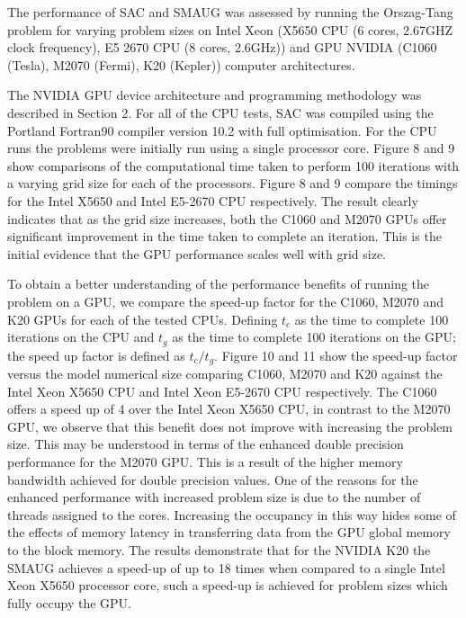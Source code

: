 The performance of SAC and SMAUG was assessed by running the Orszag-Tang problem for varying problem sizes on Intel Xeon (X5650 CPU (6 cores, 2.67GHZ clock frequency), E5 2670 CPU (8 cores, 2.6GHz)) and GPU NVIDIA (C1060 (Tesla), M2070 (Fermi), K20 (Kepler)) computer architectures.

The NVIDIA GPU device architecture and programming methodology was described in Section 2. For all of the CPU tests, SAC was compiled using the Portland Fortran90 compiler version 10.2 with full optimisation. For the CPU runs the problems were initially run using a single processor core. Figure 8 and 9 show comparisons of the computational time taken to perform 100 iterations with a varying grid size for each of the processors. Figure 8 and 9 compare the timings for the Intel X5650  and Intel E5-2670 CPU respectively. The result clearly indicates that as the grid size increases, both the C1060 and M2070 GPUs offer significant improvement in the time taken to complete an iteration. This is the initial evidence that the GPU performance scales well with grid size. 

To obtain a better understanding of the performance benefits of running the problem on a GPU, we compare the speed-up factor for the C1060, M2070 and K20 GPUs for each of the tested CPUs. Defining $t_{c}$ as the time to complete 100 iterations on the CPU and $t_{g}$ as the time to complete 100 iterations on the GPU; the speed up factor is defined as ${t_{c}}/{t_{g}}$. Figure 10 and 11 show the speed-up factor versus the model numerical size comparing C1060, M2070 and K20 against the Intel Xeon X5650 CPU and Intel Xeon E5-2670 CPU respectively.  The C1060 offers a speed up of 4 over the Intel Xeon X5650 CPU, in contrast to the M2070 GPU, we observe that this benefit does not improve with increasing the problem size. This may be understood in terms of the enhanced double precision performance for the M2070 GPU. This is a result of the higher memory bandwidth achieved for double precision values. One of the reasons for the enhanced performance with increased problem size is due to the number of threads assigned to the cores. Increasing the occupancy in this way hides some of the effects of memory latency in transferring data from the GPU global memory to the block memory. The results demonstrate that for the NVIDIA K20 the SMAUG achieves a speed-up of up to 18 times when compared to a single Intel Xeon X5650 processor core, such a speed-up is achieved for problem sizes which fully occupy the GPU. 

